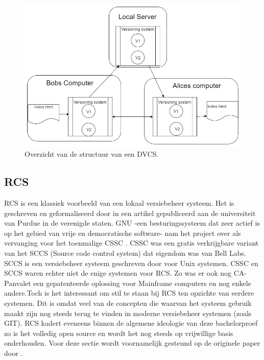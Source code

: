 \begin{itemize}
\begin{figure}[h!]
	\centering
	\caption[Overzicht structuur DVCS]{Overzicht van de structuur van een DVCS.}
	\label{fig:dvcs}
	\includegraphics[scale=0.5]{DVCS.png}
\end{figure}

\end{itemize}

\subsection{RCS}

RCS is een klassiek voorbeeld van een lokaal versiebeheer systeem. Het is geschreven en geformaliseerd door \textcite{Tichy85rcs} in een artikel gepubliceerd aan de universiteit van Purdue in de verenigde staten. GNU -een besturingssysteem dat zeer actief is op het gebied van vrije en democratische software- nam het project over als vervanging voor het toenmalige CSSC \autocite{GNUCSSC}. CSSC was een gratis verkrijgbare variant van het SCCS (Source code control system) dat eigendom was van Bell Labs. SCCS is een versiebeheer systeem geschreven door \textcite{Rochkind1975} voor Unix systemen. CSSC en SCCS waren echter niet de enige systemen voor RCS. Zo was er ook nog CA-Panvalet een gepatenteerde oplossing voor Mainframe computers en nog enkele andere.Toch is het interessant om stil te staan bij RCS ten opzichte van eerdere systemen. Dit is omdat veel van de concepten die waarvan het systeem gebruik maakt zijn nog steeds terug te vinden in moderne versiebeheer systemen (zoals GIT). RCS kadert eveneens binnen de algemene ideologie van deze bachelorproef zo is het volledig open source en wordt het nog steeds op vrijwillige basis onderhouden. Voor deze sectie wordt voornamelijk gesteund op de originele paper door \textcite{Tichy85rcs}.\\

